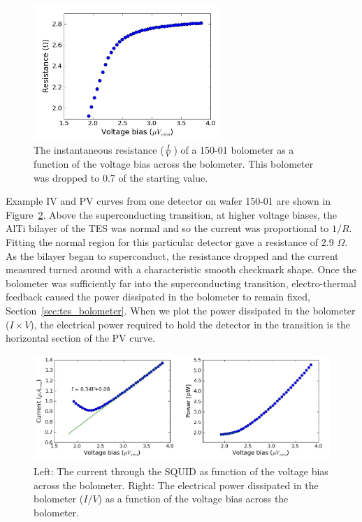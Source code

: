 \begin{figure}[htbp]
\begin{center}
\includegraphics[height=2in]{figures/RV_201007301208.png} 
\caption{The instantaneous resistance ($I \over V$) of a 150-01 bolometer as a function of the voltage bias across the bolometer. This bolometer was dropped to 0.7 of the starting value. 
\label{fig:bolo_rv_curve} }
\end{center}
\end{figure}


Example IV and PV curves from one detector on wafer 150-01 are shown in Figure~\ref{fig:bolo_iv_curve}.
Above the superconducting transition, at higher voltage biases, the AlTi bilayer of the \ac{TES} was normal and so the current was proportional to $1 / R$. 
Fitting the normal region for this particular detector gave a resistance of 2.9 $\Omega$. 
As the bilayer began to superconduct, the resistance dropped and the current measured turned around with a characteristic smooth checkmark shape. 
Once the bolometer was sufficiently far into the superconducting transition, electro-thermal feedback caused the power dissipated in the bolometer to remain fixed, Section~\ref{sec:tes_bolometer}.
When we plot the power dissipated in the bolometer ($I \times V$), the electrical power required to hold the detector in the transition is the horizontal section of the PV curve.

\begin{figure}[htbp]
\begin{center}
\includegraphics[width=0.99\columnwidth]{figures/IV_201007301208.png} 
\caption{Left: The current through the \ac{SQUID} as function of the voltage bias across the bolometer. Right: The electrical power dissipated in the bolometer ($I / V$) as a function of the voltage bias across the bolometer.
\label{fig:bolo_iv_curve} }
\end{center}
\end{figure}

